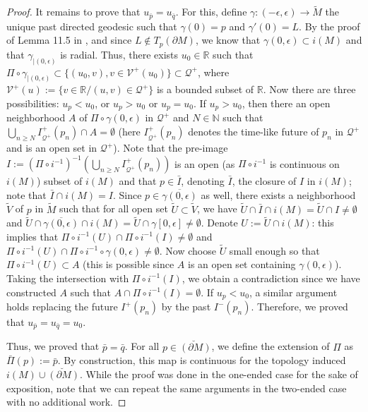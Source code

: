 \documentclass[10pt,a4paper]{article}
\theoremstyle{plain}
\theoremstyle{remark}
\theoremstyle{definition}
\newcommand{\RR}{\mathbb{R}}
\theoremstyle{plain}
\theoremstyle{remark}
\theoremstyle{definition}
\numberwithin{equation}{section}
\begin{document}
\begin{proof}
  It remains to prove that  $u_{\bar{p}}=u_{\bar{q}}$. For this, define $\gamma: (-\epsilon,\epsilon) \rightarrow \tilde{M}$ the unique past directed geodesic such that $\gamma(0)=p$ and $\gamma'(0)=L$.  By the proof of Lemma 11.5 in \cite{JonathanStab}, and since $L\notin T_p( \partial M)$, we know that $\gamma(0,\epsilon) \subset i(M)$ and that $\gamma_{|(0,\epsilon)}$ is radial. Thus, there exists $u_0 \in \RR$ such that $\Pi \circ \gamma_{|(0,\epsilon)} \subset \{ (u_0,v), v\in \mathcal{V}^+(u_0) \} \subset \mathcal{Q}^+$, where $\mathcal{V}^+(u):=\{ v\in \RR/ (u,v) \in \mathcal{Q}^+\}$ is a bounded subset of $\RR$. Now there are three possibilities: $u_p < u_0$, or $u_p >u_0$ or $u_p=u_0$. If $u_p>u_0$, then there an open neighborhood $A$ of $\Pi \circ \gamma(0,\epsilon)$ in $\mathcal{Q}^+$ and $N \in \mathbb{N}$ such that $\bigcup_{n \geq N} I^+_{ \mathcal{Q}^+}(p_n) \cap A = \emptyset$ (here $I^+_{ \mathcal{Q}^+}(p_n)$ denotes the time-like future of $p_n$ in $\mathcal{Q}^+$ and is an open set in  $\mathcal{Q}^+$). Note that the pre-image $I:=(\Pi\circ i^{-1})^{-1}(\bigcup_{n \geq N} I^+_{ \mathcal{Q}^+}(p_n) )$ is an open (as $\Pi\circ i^{-1}$ is continuous on $i(M)$) subset of $i(M)$ and that $p \in \bar{I}$, denoting $\bar{I}$, the closure of $I$ in $i(M)$; note that $ \bar{I} \cap i(M) = I$. Since $p \in \overline{ \gamma(0,\epsilon)}$ as well, there exists a neighborhood $\tilde{V}$ of $p$ in $\tilde{M}$ such that for all open set $ \tilde{U} \subset \tilde{V}$, we have $\tilde{U} \cap \bar{I} \cap i(M)= \tilde{U} \cap I \neq \emptyset$ and $\tilde{U} \cap \overline{ \gamma(0,\epsilon)} \cap i(M)= \tilde{U} \cap  \gamma[0,\epsilon] \neq \emptyset$. Denote $U:= \tilde{U}  \cap i(M)$: this implies that $\Pi\circ i^{-1}(U) \cap \Pi \circ i^{-1}(I) \neq \emptyset$ and $\Pi\circ i^{-1}(U) \cap \Pi \circ i^{-1} \circ \gamma(0,\epsilon) \neq \emptyset$. Now choose $\tilde{U}$ small enough so that $\Pi \circ i^{-1} (U) \subset A$ (this is possible since $A$ is an open set containing $\gamma(0,\epsilon)$). Taking the intersection with $\Pi \circ i^{-1}(I) $, we obtain a contradiction since we have constructed $A$ such that $A \cap \Pi \circ i^{-1}(I) = \emptyset$. If $u_p<u_0$, a similar argument holds replacing the future $I^+(p_n)$ by the past $I^-(p_n) $. Therefore, we proved that $u_{\bar{p}}=u_{\bar{q}}=u_0$.
  
 Thus, we proved that $\bar{p}=\bar{q}$. For all $p \in \breve{(\partial M)}$, we define the extension of $\Pi$ as $\bar{\Pi}(p):=\bar{p}$. By construction, this map is continuous for the topology induced $i(M) \cup \breve{(\partial M)}$. While the proof was done in the one-ended case for the sake of exposition, note that we can repeat the same arguments in the two-ended case with no additional work.
 

\end{proof}
\end{document}
